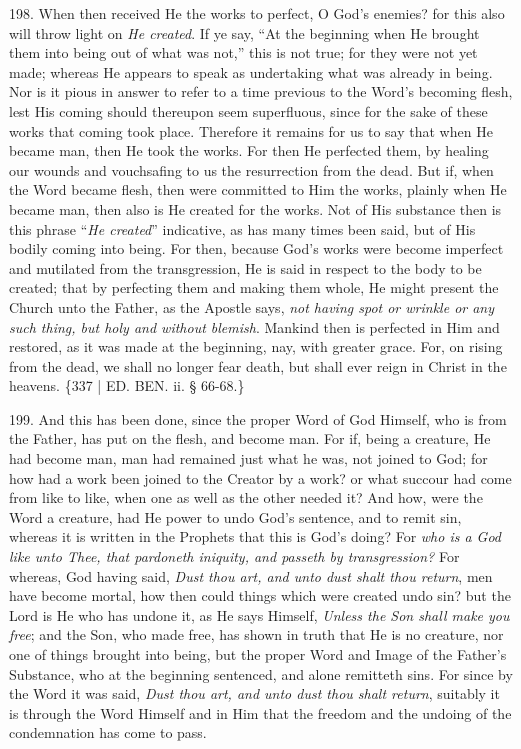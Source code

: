 198. When then received He the
works to perfect, O God's enemies? for this also will throw light on \emph{He
created}. If ye say, ``At the beginning when He brought them into
being out of what was not,'' this is not true; for they were not yet
made; whereas He appears to speak as undertaking what was already in
being. Nor is it pious in answer to refer to a time previous to the
Word's becoming flesh, lest His coming should thereupon seem
superfluous, since for the sake of these works that coming took place.
Therefore it remains for us to say that when He became man, then He
took the works. For then He perfected them, by healing our wounds and
vouchsafing to us the resurrection from the dead. But if, when the
Word became flesh, then were committed to Him the works, plainly when
He became man, then also is He created for the works. Not of His
substance then is this phrase ``\emph{He created}'' indicative, as has
many times been said, but of His bodily coming into being. For then,
because God's works were become imperfect and mutilated from the
transgression, He is said in respect to the body to be created; that
by perfecting them and making them whole, He might present the Church
unto the Father, as the Apostle says, \emph{not having spot or wrinkle or
any such thing, but holy and without blemish}. Mankind then is
perfected in Him and restored, as it was made at the beginning, nay,
with greater grace. For, on rising from the dead, we shall no longer
fear death, but shall ever reign in Christ in the heavens. \{337 | ED. BEN.
ii. § 66-68.\}

199. And this has been done,
since the proper Word of God Himself, who is from the Father, has put
on the flesh, and become man. For if, being a creature, He had become
man, man had remained just what he was, not joined to God; for how had
a work been joined to the Creator by a work? or what succour had come
from like to like, when one as well as the other needed it? And how,
were the Word a creature, had He power to undo God's sentence, and to
remit sin, whereas it is written in the Prophets that this is God's
doing? For \emph{who is a God like unto Thee, that pardoneth iniquity,
and passeth by transgression?} For whereas, God having said, \emph{Dust
thou art, and unto dust shalt thou return}, men have become mortal,
how then could things which were created undo sin? but the Lord is He
who has undone it, as He says Himself, \emph{Unless the Son shall make
you free}; and the Son, who made free, has shown in truth that He
is no creature, nor one of things brought into being, but the proper
Word and Image of the Father's Substance, who at the beginning
sentenced, and alone remitteth sins. For since by the Word it was
said, \emph{Dust thou art, and unto dust thou shalt return}, suitably
it is through the Word Himself and in Him that the freedom and the
undoing of the condemnation has come to pass.

